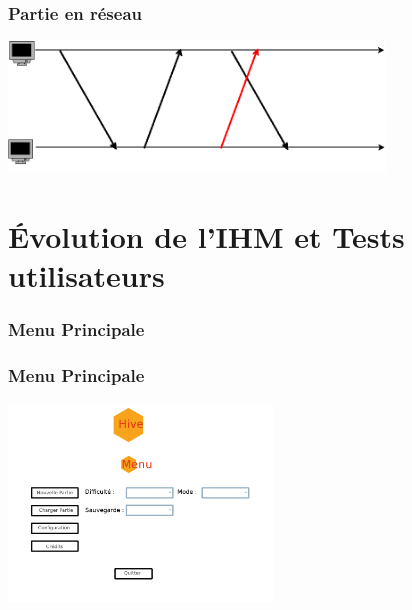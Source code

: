 \documentclass{beamer}
\begin{document}
    \begin{frame}
        \frametitle{Partie en r\'eseau}
        \includegraphics[width=10cm]{echangeBUG.png}
    \end{frame}




\section{\'Evolution de l'IHM et Tests utilisateurs}%
\begin{frame}
\end{frame}
\begin{frame}
    \frametitle{Menu Principale}
\end{frame}
\begin{frame}
    \frametitle{Menu Principale}
    \begin{center}
    \includegraphics[width=7cm]{menuPrincipalv1.png}
    \end{center}
\end{frame}
\end{document}
